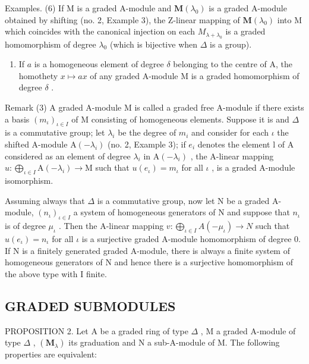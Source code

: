 Examples. (6) If M is a graded A-module and \(\mathbf{M}(\lambda_{0})\) is a graded A-module obtained by shifting (no. 2, Example 3), the Z-linear mapping of \(\mathbf{M}(\lambda_{0})\) into M which coincides with the canonical injection on each \(M_{\lambda+\lambda_{0}}\) is a graded homomorphism of degree \(\lambda_{0}\) (which is bijective when \(\Delta\) is a group).

\begin{enumerate}
\def\labelenumi{(\arabic{enumi})}
\setcounter{enumi}{6}
\tightlist
\item
  If \(a\) is a homogeneous element of degree \(\delta\) belonging to the centre of A, the homothety \(x \mapsto ax\) of any graded A-module M is a graded homomorphism of degree \(\delta\) .
\end{enumerate}

Remark (3) A graded A-module M is called a graded free A-module if there exists a basis \((m_{\iota})_{\iota \in I}\) of M consisting of homogeneous elements. Suppose it is and \(\Delta\) is a commutative group; let \(\lambda_{i}\) be the degree of \(m_{i}\) and consider for each \(\iota\) the shifted A-module \(\mathrm{A}(-\lambda_{i})\) (no. 2, Example 3); if \(e_{i}\) denotes the element l of A considered as an element of degree \(\lambda_{i}\) in \(\mathrm{A}(-\lambda_{i})\) , the A-linear mapping \(u: \bigoplus_{\iota \in I} \mathrm{A}(-\lambda_{i}) \to \mathrm{M}\) such that \(u(e_{\iota}) = m_{\iota}\) for all \(\iota\) , is a graded A-module isomorphism.

Assuming always that \(\Delta\) is a commutative group, now let N be a graded A-module, \((n_{\iota})_{\iota \in I}\) a system of homogeneous generators of N and suppose that \(n_{\iota}\) is of degree \(\mu_{\iota}\) . Then the A-linear mapping \(v: \bigoplus_{\iota \in I} A(-\mu_{\iota}) \to N\) such that \(u(e_{\iota}) = n_{\iota}\) for all \(\iota\) is a surjective graded A-module homomorphism of degree 0. If N is a finitely generated graded A-module, there is always a finite system of homogeneous generators of N and hence there is a surjective homomorphism of the above type with I finite.

\subsection{GRADED SUBMODULES}

PROPOSITION 2. Let A be a graded ring of type \(\Delta\) , M a graded A-module of type \(\Delta\) , \((\mathbf{M}_{\lambda})\) its graduation and N a sub-A-module of M. The following properties are equivalent:

